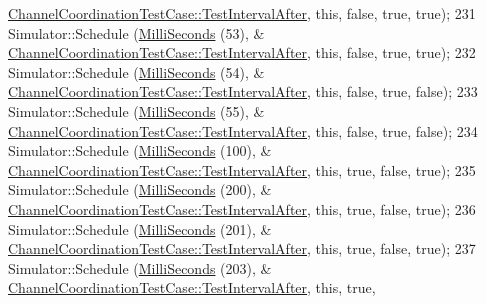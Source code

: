 \begin{DoxyCode}
      \hyperlink{classChannelCoordinationTestCase_a5a6891984b8599dbffd80e80b6faf92a}{ChannelCoordinationTestCase::TestIntervalAfter}, \textcolor{keyword}{this}, \textcolor{keyword}{false}, \textcolor{keyword}{
      true}, \textcolor{keyword}{true});
231   Simulator::Schedule (\hyperlink{group__timecivil_gaf26127cf4571146b83a92ee18679c7a9}{MilliSeconds} (53), &
      \hyperlink{classChannelCoordinationTestCase_a5a6891984b8599dbffd80e80b6faf92a}{ChannelCoordinationTestCase::TestIntervalAfter}, \textcolor{keyword}{this}, \textcolor{keyword}{false}, \textcolor{keyword}{
      true}, \textcolor{keyword}{true});
232   Simulator::Schedule (\hyperlink{group__timecivil_gaf26127cf4571146b83a92ee18679c7a9}{MilliSeconds} (54), &
      \hyperlink{classChannelCoordinationTestCase_a5a6891984b8599dbffd80e80b6faf92a}{ChannelCoordinationTestCase::TestIntervalAfter}, \textcolor{keyword}{this}, \textcolor{keyword}{false}, \textcolor{keyword}{
      true}, \textcolor{keyword}{false});
233   Simulator::Schedule (\hyperlink{group__timecivil_gaf26127cf4571146b83a92ee18679c7a9}{MilliSeconds} (55), &
      \hyperlink{classChannelCoordinationTestCase_a5a6891984b8599dbffd80e80b6faf92a}{ChannelCoordinationTestCase::TestIntervalAfter}, \textcolor{keyword}{this}, \textcolor{keyword}{false}, \textcolor{keyword}{
      true}, \textcolor{keyword}{false});
234   Simulator::Schedule (\hyperlink{group__timecivil_gaf26127cf4571146b83a92ee18679c7a9}{MilliSeconds} (100), &
      \hyperlink{classChannelCoordinationTestCase_a5a6891984b8599dbffd80e80b6faf92a}{ChannelCoordinationTestCase::TestIntervalAfter}, \textcolor{keyword}{this}, \textcolor{keyword}{true}, \textcolor{keyword}{
      false}, \textcolor{keyword}{true});
235   Simulator::Schedule (\hyperlink{group__timecivil_gaf26127cf4571146b83a92ee18679c7a9}{MilliSeconds} (200), &
      \hyperlink{classChannelCoordinationTestCase_a5a6891984b8599dbffd80e80b6faf92a}{ChannelCoordinationTestCase::TestIntervalAfter}, \textcolor{keyword}{this}, \textcolor{keyword}{true}, \textcolor{keyword}{
      false}, \textcolor{keyword}{true});
236   Simulator::Schedule (\hyperlink{group__timecivil_gaf26127cf4571146b83a92ee18679c7a9}{MilliSeconds} (201), &
      \hyperlink{classChannelCoordinationTestCase_a5a6891984b8599dbffd80e80b6faf92a}{ChannelCoordinationTestCase::TestIntervalAfter}, \textcolor{keyword}{this}, \textcolor{keyword}{true}, \textcolor{keyword}{
      false}, \textcolor{keyword}{true});
237   Simulator::Schedule (\hyperlink{group__timecivil_gaf26127cf4571146b83a92ee18679c7a9}{MilliSeconds} (203), &
      \hyperlink{classChannelCoordinationTestCase_a5a6891984b8599dbffd80e80b6faf92a}{ChannelCoordinationTestCase::TestIntervalAfter}, \textcolor{keyword}{this}, \textcolor{keyword}{true}, \textcolor{keyword}{
}
\end{DoxyCode}
